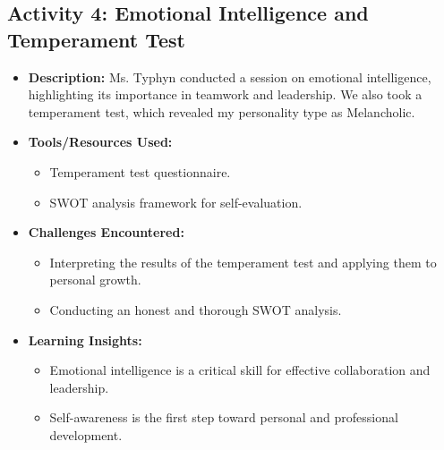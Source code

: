 \documentclass{article}
\begin{document}
\subsection*{Activity 4: Emotional Intelligence and Temperament Test}
\begin{itemize}
    \item \textbf{Description:} Ms. Typhyn conducted a session on emotional intelligence, highlighting its importance in teamwork and leadership. We also took a temperament test, which revealed my personality type as Melancholic.
    \item \textbf{Tools/Resources Used:}
    \begin{itemize}
        \item Temperament test questionnaire.
        \item SWOT analysis framework for self-evaluation.
    \end{itemize}
    \item \textbf{Challenges Encountered:}
    \begin{itemize}
        \item Interpreting the results of the temperament test and applying them to personal growth.
        \item Conducting an honest and thorough SWOT analysis.
    \end{itemize}
    \item \textbf{Learning Insights:}
    \begin{itemize}
        \item Emotional intelligence is a critical skill for effective collaboration and leadership.
        \item Self-awareness is the first step toward personal and professional development.
    \end{itemize}
\end{itemize}
\end{document}
